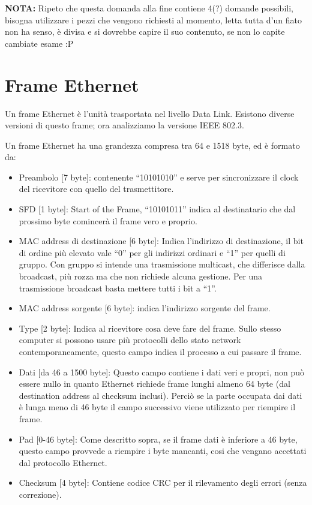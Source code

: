 \textbf{NOTA:} Ripeto che questa domanda alla fine contiene 4(?) domande possibili, bisogna utilizzare i pezzi che vengono richiesti al momento, letta tutta d’un fiato non ha senso, è divisa e si dovrebbe capire il suo contenuto, se non lo capite cambiate esame :P

\section{Frame Ethernet}

Un frame Ethernet è l’unità trasportata nel livello Data Link.
Esistono diverse versioni di questo frame; ora analizziamo la versione IEEE 802.3. 

Un frame Ethernet ha una grandezza compresa tra 64 e 1518 byte, ed è formato da:
\begin{itemize}
\item	Preambolo [7 byte]: contenente “10101010” e serve per sincronizzare il clock del ricevitore con quello del trasmettitore.
\item	SFD [1 byte]: Start of the Frame, “10101011” indica al destinatario che dal prossimo byte comincerà il frame vero e proprio.
\item	MAC address di destinazione [6 byte]: Indica l’indirizzo di destinazione, il bit di ordine più elevato vale “0” per gli indirizzi ordinari e “1” per quelli di gruppo. Con gruppo si intende una trasmissione multicast, che differisce dalla broadcast, più rozza ma che non richiede alcuna gestione. Per una trasmissione broadcast basta mettere tutti i bit a “1”.
\item	MAC address sorgente [6 byte]: indica l’indirizzo sorgente del frame.
\item	Type [2 byte]: Indica al ricevitore cosa deve fare del frame. Sullo stesso computer si possono usare più protocolli dello stato network contemporaneamente, questo campo indica il processo a cui passare il frame.
\item	Dati [da 46 a 1500 byte]: Questo campo contiene i dati veri e propri, non può essere nullo in quanto Ethernet richiede frame lunghi almeno 64 byte (dal destination address al checksum inclusi). Perciò se la parte occupata dai dati è lunga meno di 46 byte il campo successivo viene utilizzato per riempire il frame.
\item	Pad [0-46 byte]: Come descritto sopra, se il frame dati è inferiore a 46 byte, questo campo provvede a riempire i byte mancanti, cosi che vengano accettati dal protocollo Ethernet.
\item	Checksum [4 byte]: Contiene codice CRC per il rilevamento degli errori (senza correzione).
\end{itemize}

